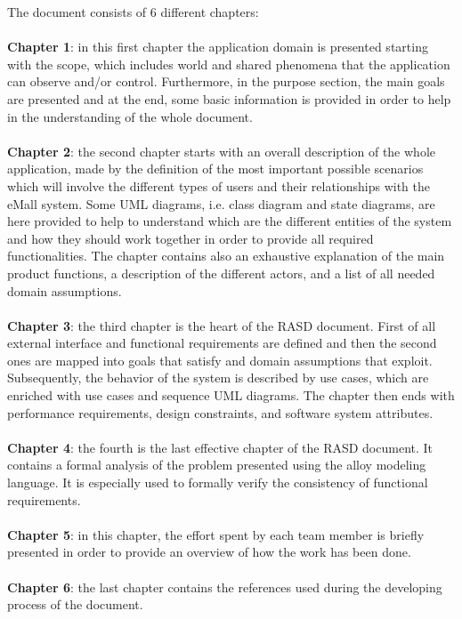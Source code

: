 \documentclass[a4paper]{report}
\begin{document}
The document consists of 6 different chapters:
\\ 
\\
\textbf{Chapter 1}: in this first chapter the application domain is presented starting with the scope, which includes world and shared phenomena that the application can observe and/or control. Furthermore, in the purpose section, the main goals are presented and at the end, some basic information is provided in order to help in the understanding of the whole document.\\ \\
\textbf{Chapter 2}: the second chapter starts with an overall description of the whole application, made by the definition of the most important possible scenarios which will involve the different types of users and their relationships with the eMall system. Some UML diagrams, i.e. class diagram and state diagrams, are here provided to help to understand which are the different entities of the system and how they should work together in order to provide all required functionalities. The chapter contains also an exhaustive explanation of the main product functions, a description of the different actors, and a list of all needed domain assumptions.\\ \\
\textbf{Chapter 3}: the third chapter is the heart of the RASD document. First of all external interface and functional requirements are defined and then the second ones are mapped into goals that satisfy and domain assumptions that exploit. Subsequently, the behavior of the system is described by use cases, which are enriched with use cases and sequence UML diagrams. The chapter then ends with performance requirements, design constraints, and software system attributes.\\ \\
\textbf{Chapter 4}: the fourth is the last effective chapter of the RASD document. It contains a formal analysis of the problem presented using the alloy modeling language. It is especially used to formally verify the consistency of functional requirements.\\ \\
\textbf{Chapter 5}: in this chapter, the effort spent by each team member is briefly presented in order to provide an overview of how the work has been done.\\ \\
\textbf{Chapter 6}: the last chapter contains the references used during the developing process of the document.
\end{document}
